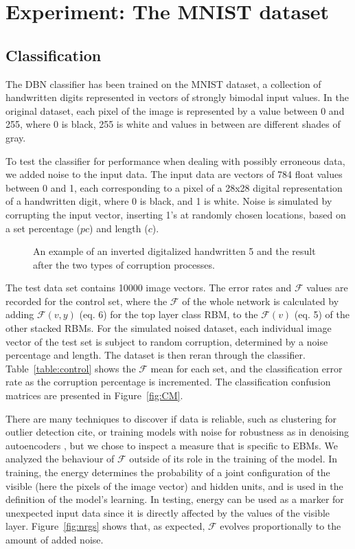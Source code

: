 \documentclass{report}
\begin{document}
\section{Experiment: The MNIST dataset}
\subsection{Classification}
The DBN classifier has been trained on the MNIST dataset, a collection of handwritten digits represented in vectors of strongly bimodal input values. In the original dataset, each pixel of the image is represented by a value between 0 and 255, where 0 is black, 255 is white and values in between are different shades of gray.


To test the classifier for performance when dealing with possibly erroneous data, we added noise to the input data. The input data are vectors of 784 float values between 0 and 1, each corresponding to a pixel of a 28x28 digital representation of a handwritten digit, where 0 is black, and 1 is white. Noise is simulated by corrupting the input vector, inserting 1's at randomly chosen locations, based on a set percentage ($pc$) and length ($c$).

\begin{figure}[h!]
	\caption{An example of an inverted digitalized handwritten 5 and the result after the two types of corruption processes.}
\end{figure}


The test data set contains 10000 image vectors. The error rates and $\mathcal{F}$ values are recorded for the control set, where the $\mathcal{F}$ of the whole network is calculated by adding $\mathcal{F}(v,y)$ (eq. 6) for the top layer class RBM, to the $\mathcal{F}(v)$ (eq. 5) of the other stacked RBMs. For the simulated noised dataset, each individual image vector of the test set is subject to random corruption, determined by a noise percentage and length. The dataset is then reran through the classifier. Table~\ref{table:control} shows the $\mathcal{F}$ mean for each set, and the classification error rate as the corruption percentage is incremented. The classification confusion matrices are presented in Figure~\ref{fig:CM}.


There are many techniques to discover if data is reliable, such as clustering for outlier detection cite{}, or training models with noise for robustness as in denoising autoencoders \cite{Vincent}, but we chose to inspect a measure that is specific to EBMs. We analyzed the behaviour of $\mathcal{F}$ outside of its role in the training of the model. In training, the energy determines the probability of a joint configuration of the visible (here the pixels of the image vector) and hidden units, and is used in the definition of the model's learning. In testing, energy can be used as a marker for unexpected input data since it is directly affected by the values of the visible layer. Figure~\ref{fig:nrgs} shows that, as expected, $\mathcal{F}$ evolves proportionally to the amount of added noise. 
\end{document}
